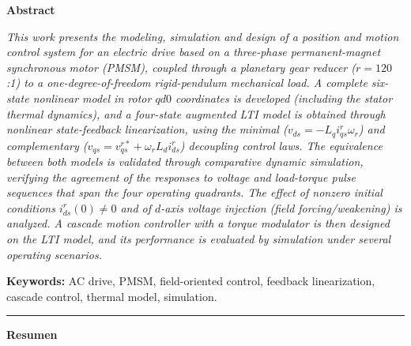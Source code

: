 \documentclass[12pt, a4paper,journal, onecolumn, compsoc]{IEEEtran}
\begin{document}
\setcounter{page}{1}
\thispagestyle{fancy}

\vspace*{-1cm}
\noindent\textbf{\large Abstract}
\vspace{4pt}

\noindent\textit{This work presents the modeling, simulation and design of a position and motion control system for an electric drive based on a three-phase permanent-magnet synchronous motor (PMSM), coupled through a planetary gear reducer ($r=120$:1) to a one-degree-of-freedom rigid-pendulum mechanical load. A complete six-state nonlinear model in rotor $qd0$ coordinates is developed (including the stator thermal dynamics), and a four-state augmented LTI model is obtained through nonlinear state-feedback linearization, using the minimal ($v_{ds}=-L_q i_{qs}^r\omega_r$) and complementary ($v_{qs}=v_{qs}^{r*}+\omega_r L_d i_{ds}^r$) decoupling control laws. The equivalence between both models is validated through comparative dynamic simulation, verifying the agreement of the responses to voltage and load-torque pulse sequences that span the four operating quadrants. The effect of nonzero initial conditions $i_{ds}^{r}(0)\neq 0$ and of $d$-axis voltage injection (field forcing/weakening) is analyzed. A cascade motion controller with a torque modulator is then designed on the LTI model, and its performance is evaluated by simulation under several operating scenarios.}

\vspace{6pt}
\noindent\textbf{Keywords:} AC drive, PMSM, field-oriented control, feedback linearization, cascade control, thermal model, simulation.

\vspace{8pt}
\noindent\rule{\textwidth}{0.4pt}
\vspace{4pt}

\noindent\textbf{\large Resumen}
\vspace{4pt}
\end{document}
